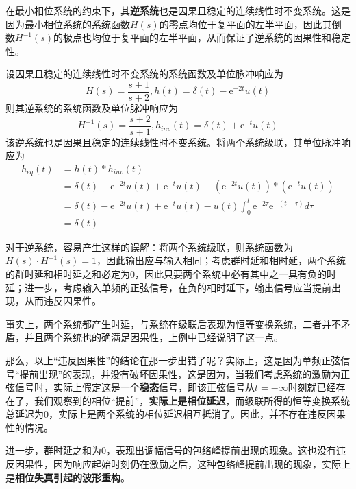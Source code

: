 \documentclass{ctexbook}
\begin{document}
在最小相位系统的约束下，其\textbf{逆系统}也是因果且稳定的连续线性时不变系统。这是因为最小相位系统的系统函数$H(s)$的零点均位于复平面的左半平面，因此其倒数$H^{-1}(s)$的极点也均位于复平面的左半平面，从而保证了逆系统的因果性和稳定性。

\begin{example}
    设因果且稳定的连续线性时不变系统的系统函数及单位脉冲响应为
    \[H(s)=\frac{s+1}{s+2},h(t)=\delta(t)-\mathrm{e}^{-2t}u(t)\]
    则其逆系统的系统函数及单位脉冲响应为
    \[H^{-1}(s)=\frac{s+2}{s+1},h_{inv}(t)=\delta(t)+\mathrm{e}^{-t}u(t)\]
    该逆系统也是因果且稳定的连续线性时不变系统。将两个系统级联，其单位脉冲响应为
\begin{align*}
    h_{eq}(t)&=h(t)*h_{inv}(t)\\
    &=\delta(t)-\mathrm{e}^{-2t}u(t)+\mathrm{e}^{-t}u(t)-(\mathrm{e}^{-2t}u(t))*(\mathrm{e}^{-t}u(t))\\
    &=\delta(t)-\mathrm{e}^{-2t}u(t)+\mathrm{e}^{-t}u(t)-u(t)\int_0^t \mathrm{e}^{-2\tau}\mathrm{e}^{-(t-\tau)}d\tau\\
    &=\delta(t)
\end{align*}
\end{example}

对于逆系统，容易产生这样的误解：将两个系统级联，则系统函数为$H(s)\cdot H^{-1}(s)=1$，因此输出应与输入相同；考虑群时延和相时延，两个系统的群时延和相时延之和必定为0，因此只要两个系统中必有其中之一具有负的时延；进一步，考虑输入单频的正弦信号，在负的相时延下，输出信号应当提前出现，从而违反因果性。

事实上，两个系统都产生时延，与系统在级联后表现为恒等变换系统，二者并不矛盾，并且两个系统也的确满足因果性，上例中已经说明了这一点。

那么，以上“违反因果性”的结论在那一步出错了呢？实际上，这是因为单频正弦信号“提前出现”的表现，并没有破坏因果性，这是因为，当我们考虑系统的激励为正弦信号时，实际上假定这是一个\textbf{稳态}信号，即该正弦信号从$t=-\infty$时刻就已经存在了，我们观察到的相位“提前”，\textbf{实际上是相位延迟}，而级联所得的恒等变换系统总延迟为0，实际上是两个系统的相位延迟相互抵消了。因此，并不存在违反因果性的情况。

进一步，群时延之和为0，表现出调幅信号的包络峰提前出现的现象。这也没有违反因果性，因为响应起始时刻仍在激励之后，这种包络峰提前出现的现象，实际上是\textbf{相位失真引起的波形重构}。
\end{document}
